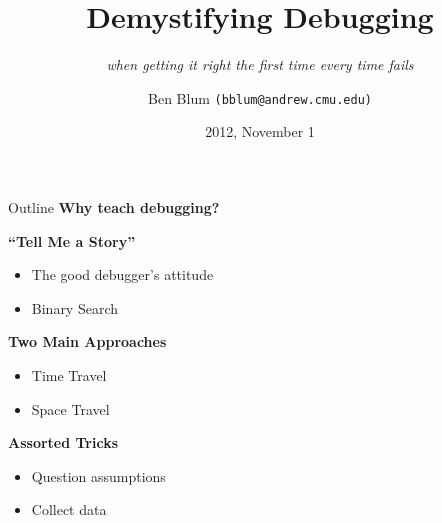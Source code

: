 \documentclass[xcolor=dvipsnames]{beamer}
\title[Demystifying Debugging]{{\bf Demystifying Debugging}}
\subtitle[]{{\em when getting it right the first time every time fails}}
\author[Ben Blum]{Ben Blum \texttt{(bblum@andrew.cmu.edu)}}
\institute[98-172]{Great Practical Ideas for Computer Scientists}
\date[]{2012, November 1}
\begin{document}
\normalem
\begin{frame}
	\titlepage
\end{frame}


\newcommand\linegap{\vspace{0.2in}}
\newcommand\breakslide[1]{\begin{frame}{} \begin{center} \Large #1 \end{center} \end{frame}}
\newcommand\related[1]{\textsuperscript{\em [#1]}}
\newcommand\hilight[2]{\color{#1}#2\color{black}}


\begin{frame}{Outline}
	\textbf{Why teach debugging?}
	\linegap

	\textbf{``Tell Me a Story''}
	\begin{itemize}
		\item The good debugger's attitude
		\item Binary Search
	\end{itemize}
	\linegap

	{\bf Two Main Approaches}
	\begin{itemize}
		\item Time Travel
		\item Space Travel
	\end{itemize}
	\linegap

	{\bf Assorted Tricks}
	\begin{itemize}
		\item Question assumptions
		\item Collect data
	\end{itemize}
\end{frame}

\end{document}
